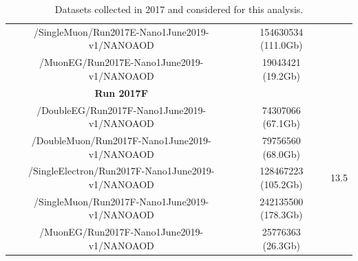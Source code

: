 \documentclass[a4paper, 10pt, openright]{report}
\begin{document}
\begin{appendices}
\begin{table}
\begin{center}
{\begin{tabular}{ c|c|c }
/SingleMuon/Run2017E-Nano1June2019-v1/NANOAOD & 154630534 (111.0Gb) & \\
/MuonEG/Run2017E-Nano1June2019-v1/NANOAOD & 19043421 (19.2Gb) & \\
 \hline
\textbf{Run 2017F} & & \\ 
/DoubleEG/Run2017F-Nano1June2019-v1/NANOAOD & 74307066 (67.1Gb) & \multirow{ 5}{*}{13.5} \\
/DoubleMuon/Run2017F-Nano1June2019-v1/NANOAOD & 79756560 (68.0Gb) & \\
/SingleElectron/Run2017F-Nano1June2019-v1/NANOAOD & 128467223 (105.2Gb) & \\
/SingleMuon/Run2017F-Nano1June2019-v1/NANOAOD & 242135500 (178.3Gb) \\
 /MuonEG/Run2017F-Nano1June2019-v1/NANOAOD & 25776363 (26.3Gb) & \\
 \hline
\end{tabular}
}
\caption{Datasets collected in 2017 and considered for this analysis.}
\label{table:Data2017}
\end{center}
\end{table}


\end{appendices}
\end{document}
